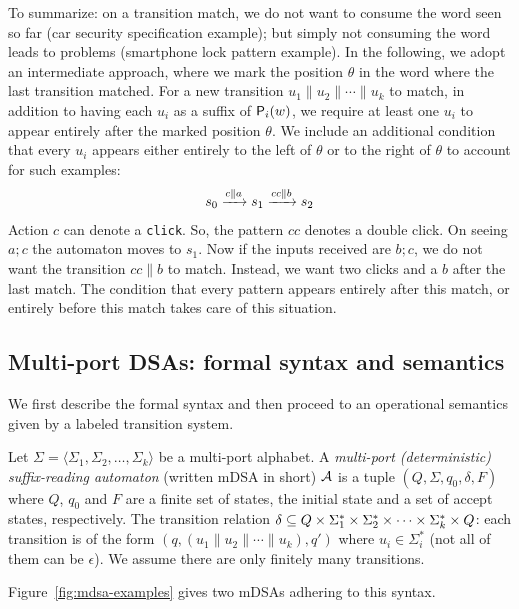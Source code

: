  To summarize: on a transition match, we do not want to consume the word seen so far (car security specification example); but simply not consuming the word leads to problems (smartphone lock pattern example). In the following, we adopt an intermediate approach, where we mark the position $\theta$ in the word where the last transition matched. For a new transition $u_1 \parallel u_2 \parallel \cdots \parallel u_k$ to match, in addition to having each $u_i$ as a suffix of $\mathsf{P}_{i}(w)$, we require at least one $u_i$ to appear entirely after the marked position $\theta$. We include an additional condition that every $u_i$ appears either entirely to the left of $\theta$ or to the right of $\theta$ to account for such examples: 
 \begin{align*}
  s_0 \xrightarrow{c \parallel a} s_1 \xrightarrow{cc \parallel b}s_2
 \end{align*}
 Action $c$ can denote a \texttt{click}. So, the pattern $cc$ denotes a double click. On seeing $a; c$ the automaton moves to $s_1$. Now if the inputs received are $b; c$, we do not want the transition $cc \parallel b$ to match. Instead, we want two clicks and a $b$ after the last match. The condition that every pattern appears entirely after this match, or entirely before this match takes care of this situation.
 




\subsection{Multi-port DSAs: formal syntax and semantics} 

We first describe the formal syntax and then proceed to an operational semantics given by a labeled transition system.

\begin{definition} Let
  $\Sigma = \langle \Sigma_1, \Sigma_2, \dots, \Sigma_k \rangle$ be a
  multi-port alphabet. A \emph{multi-port (deterministic)
    suffix-reading automaton} (written mDSA in short) $\mathcal{A}$ is a
  tuple $(Q, \Sigma, q_0, \delta, F)$ where $Q$, $q_0$ and
  $F$ are a finite set of states, the initial state and a set of
  accept states, respectively. %
  The transition relation
  $\delta \subseteq Q \times \Sigma_1^* \times \Sigma_2^* \times \cdots
  \times \Sigma_k^* \times Q$: each transition is of the form
  $(q, (u_1 \parallel u_2 \parallel \cdots \parallel u_k), q')$ where
  $u_i \in \Sigma_i^*$ (not all of them can be $\epsilon$). 
  We assume there are only finitely many transitions. 
 \end{definition}%
Figure~\ref{fig:mdsa-examples} gives two mDSAs adhering to this syntax. 

